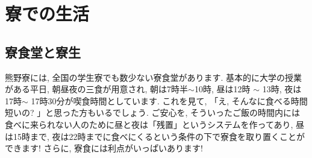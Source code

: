 \documentclass[10pt,b5jsbook,dvips,dvipdfmx,openany]{jsbook}
\theoremstyle{definition}
\begin{document}




\chapter{寮での生活} %

	\section{寮食堂と寮生}	\label{sec:cafeteria}
 	熊野寮には, 全国の学生寮でも数少ない寮食堂があります. 基本的に大学の授業がある平日, 朝昼夜の三食が用意され, 朝は7時半$\sim$10時, 昼は12時 $ \sim $ 13時, 夜は17時$ \sim $ 17時30分が喫食時間としています. これを見て, 「え, そんなに食べる時間短いの? 」と思った方もいるでしょう. ご安心を, そういったご飯の時間内には食べに来られない人のために昼と夜は「残置」というシステムを作ってあり, 昼は15時まで, 夜は22時までに食べにくるという条件の下で寮食を取り置くことができます! さらに, 寮食には利点がいっぱいあります! 
 
\end{document}
